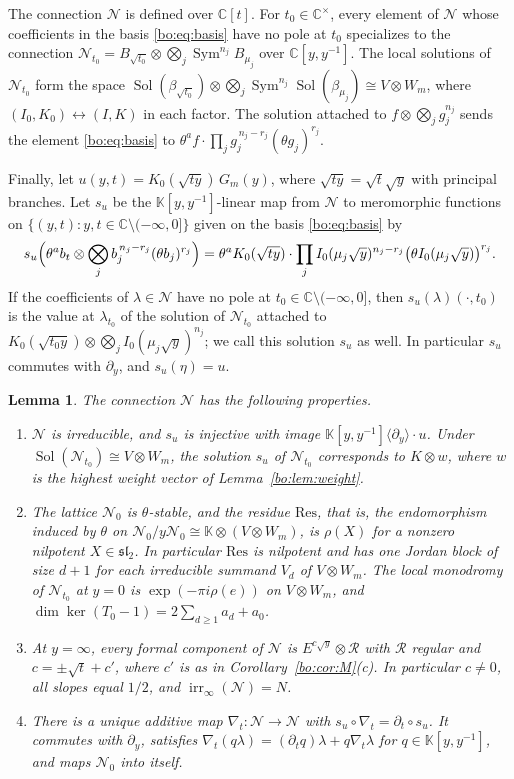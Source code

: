 \documentclass[11pt,a4paper]{article}
\newtheorem{lemma}[theorem]{Lemma}
\theoremstyle{definition}
\theoremstyle{remark}
\numberwithin{equation}{section}
\newcommand{\C}{\mathbb{C}}
\DeclareMathOperator{\Sol}{Sol}
\newcommand{\Kt}{\mathbb{K}}
\newcommand{\cN}{\mathcal{N}}
\newcommand{\sltwo}{\mathfrak{sl}_2}
\DeclareMathOperator{\Sym}{Sym}
\DeclareMathOperator{\irr}{irr}
\begin{document}
The connection $\cN$ is defined over $\C[t]$. For $t_0\in\C^\times$, every element of $\cN$ whose coefficients in the basis \eqref{bo:eq:basis} have no pole at $t_0$ specializes to the connection $\cN_{t_0}=B_{\sqrt{t_0}}\otimes\bigotimes_j\Sym^{n_j}B_{\mu_j}$ over $\C[y,y^{-1}]$. The local solutions of $\cN_{t_0}$ form the space $\Sol(\beta_{\sqrt{t_0}})\otimes\bigotimes_j\Sym^{n_j}\Sol(\beta_{\mu_j})\cong V\otimes W_m$, where $(I_0,K_0)\leftrightarrow(I,K)$ in each factor. The solution attached to $f\otimes\bigotimes_jg_j^{n_j}$ sends the element \eqref{bo:eq:basis} to $\theta^af\cdot\prod_jg_j^{\,n_j-r_j}(\theta g_j)^{r_j}$.

Finally, let $u(y,t)=K_0(\sqrt{ty})\,G_m(y)$, where $\sqrt{ty}=\sqrt t\sqrt y$ with principal branches. Let $s_u$ be the $\Kt[y,y^{-1}]$-linear map from $\cN$ to meromorphic functions on $\{(y,t):y,t\in\C\setminus(-\infty,0]\}$ given on the basis \eqref{bo:eq:basis} by
\[
s_u\Bigl(\theta^ab_t\otimes\bigotimes_jb_j^{\,n_j-r_j}(\theta b_j)^{r_j}\Bigr)=\theta^aK_0(\sqrt{ty})\cdot\prod_jI_0(\mu_j\sqrt y)^{n_j-r_j}\bigl(\theta I_0(\mu_j\sqrt y)\bigr)^{r_j}.
\]
If the coefficients of $\lambda\in\cN$ have no pole at $t_0\in\C\setminus(-\infty,0]$, then $s_u(\lambda)(\cdot,t_0)$ is the value at $\lambda_{t_0}$ of the solution of $\cN_{t_0}$ attached to $K_0(\sqrt{t_0y})\otimes\bigotimes_jI_0(\mu_j\sqrt y)^{n_j}$; we call this solution $s_u$ as well. In particular $s_u$ commutes with $\partial_y$, and $s_u(\eta)=u$.

\begin{lemma}\label{bo:lem:N}
The connection $\cN$ has the following properties.
\begin{enumerate}
\item[(a)] $\cN$ is irreducible, and $s_u$ is injective with image $\Kt[y,y^{-1}]\langle\partial_y\rangle\cdot u$. Under $\Sol(\cN_{t_0})\cong V\otimes W_m$, the solution $s_u$ of $\cN_{t_0}$ corresponds to $K\otimes w$, where $w$ is the highest weight vector of Lemma~\ref{bo:lem:weight}.
\item[(b)] The lattice $\cN_0$ is $\theta$-stable, and the residue $\mathrm{Res}$, that is, the endomorphism induced by $\theta$ on $\cN_0/y\cN_0\cong\Kt\otimes(V\otimes W_m)$, is $\rho(X)$ for a nonzero nilpotent $X\in\sltwo$. In particular $\mathrm{Res}$ is nilpotent and has one Jordan block of size $d+1$ for each irreducible summand $V_d$ of $V\otimes W_m$. The local monodromy of $\cN_{t_0}$ at $y=0$ is $\exp(-\pi i\rho(e))$ on $V\otimes W_m$, and $\dim\ker(T_0-1)=2\sum_{d\ge1}a_d+a_0$.
\item[(c)] At $y=\infty$, every formal component of $\cN$ is $E^{c\sqrt y}\otimes\mathcal R$ with $\mathcal R$ regular and $c=\pm\sqrt t+c'$, where $c'$ is as in Corollary~\ref{bo:cor:M}(c). In particular $c\ne0$, all slopes equal $1/2$, and $\irr_\infty(\cN)=N$.
\item[(d)] There is a unique additive map $\nabla_t:\cN\to\cN$ with $s_u\circ\nabla_t=\partial_t\circ s_u$. It commutes with $\partial_y$, satisfies $\nabla_t(q\lambda)=(\partial_tq)\lambda+q\nabla_t\lambda$ for $q\in\Kt[y,y^{-1}]$, and maps $\cN_0$ into itself.
\end{enumerate}
\end{lemma}
\end{document}
